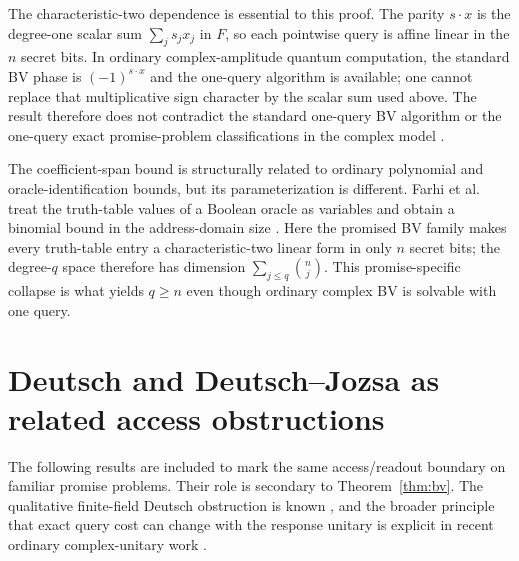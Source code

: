 \documentclass[11pt]{article}
\begin{document}
The characteristic-two dependence is essential to this proof. The parity $s\cdot x$ is the degree-one scalar sum $\sum_js_jx_j$ in $F$, so each pointwise query is affine linear in the $n$ secret bits. In ordinary complex-amplitude quantum computation, the standard BV phase is $(-1)^{s\cdot x}$ and the one-query algorithm is available; one cannot replace that multiplicative sign character by the scalar sum used above. The result therefore does not contradict the standard one-query BV algorithm or the one-query exact promise-problem classifications in the complex model \cite{Combarro2021}.

The coefficient-span bound is structurally related to ordinary polynomial and oracle-identification bounds, but its parameterization is different. Farhi et al. treat the truth-table values of a Boolean oracle as variables and obtain a binomial bound in the address-domain size \cite{Farhi1999}. Here the promised BV family makes every truth-table entry a characteristic-two linear form in only $n$ secret bits; the degree-$q$ space therefore has dimension $\sum_{j\le q}\binom nj$. This promise-specific collapse is what yields $q\ge n$ even though ordinary complex BV is solvable with one query.

\section{Deutsch and Deutsch--Jozsa as related access obstructions}\label{sec:dj}
The following results are included to mark the same access/readout boundary on familiar promise problems. Their role is secondary to Theorem~\ref{thm:bv}. The qualitative finite-field Deutsch obstruction is known \cite{James2011}, and the broader principle that exact query cost can change with the response unitary is explicit in recent ordinary complex-unitary work \cite{Svozil2026}.
\end{document}
